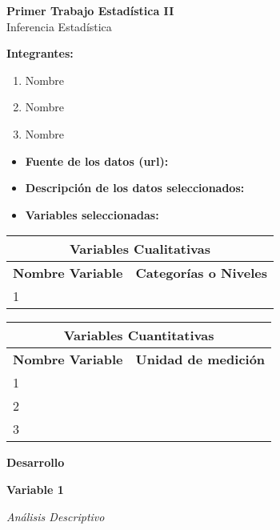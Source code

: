 \documentclass[letterpaper]{article}
\author{CARLOS ALFONSO MANTILLA DUARTE}
\date{2023-04-10}
\begin{document}
\begin{center}
\textbf{Primer Trabajo Estadística II}\\
Inferencia Estadística
\end{center}

\bigskip
\textbf{Integrantes:}

\begin{enumerate}[label=\arabic*.]
\item Nombre
\item Nombre
\item Nombre
\end{enumerate}

\bigskip
\begin{itemize}
\item \textbf{Fuente de los datos (url):}
\item \textbf{Descripción de los datos seleccionados:}
\item \textbf{Variables seleccionadas:}
\end{itemize}

\begin{center}
\begin{longtable}{|m{1.8cm}|m{1.8cm}|m{1.8cm}|}
\hline
\multicolumn{3}{|c|}{\textbf{Variables Cualitativas}}\\\hline
\multicolumn{2}{|c|}{\textbf{Nombre Variable}} &
\textbf{Categorías o Niveles}\\\hline
1 & ~ & ~\\\hline
\end{longtable}
\end{center}

\bigskip

\begin{center}
\begin{longtable}{|m{1.8cm}|m{1.8cm}|m{1.8cm}|}
\hline
\multicolumn{3}{|c|}{\textbf{Variables Cuantitativas}}\\\hline
\multicolumn{2}{|c|}{\textbf{Nombre Variable}} &
\textbf{Unidad de medición}\\\hline
1 & ~ & ~\\\hline
2 & ~ & ~\\\hline
3 & ~ & ~\\\hline
\end{longtable}
\end{center}

\bigskip
\textbf{Desarrollo}

\bigskip
\textbf{Variable 1}

\bigskip
\textit{Análisis Descriptivo}
\end{document}
